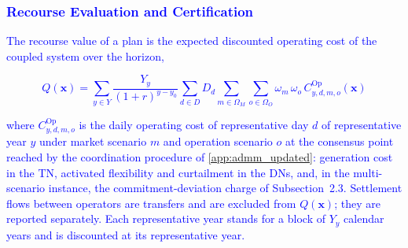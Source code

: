 
\subsubsection{\textcolor{blue}{Recourse Evaluation and Certification}}
\label{subsubsec:certification}

\textcolor{blue}{The recourse value of a plan is the expected discounted operating cost of the coupled system
over the horizon,}

\textcolor{blue}{
    \begin{equation}
        Q(\boldsymbol{x}) =
        \sum_{y \in Y} \frac{Y_y}{(1+r)^{y-y_0}}
        \sum_{d \in D} D_d
        \sum_{m \in \Omega_M} \sum_{o \in \Omega_O} \omega_m \, \omega_o \,
        C^{\text{Op}}_{y,d,m,o}(\boldsymbol{x})
        \label{eq:recourse_value}
    \end{equation}
}

\noindent
\textcolor{blue}{where $C^{\text{Op}}_{y,d,m,o}$ is the daily operating cost of representative day $d$ of
representative year $y$ under market scenario $m$ and operation scenario $o$ at the consensus point
reached by the coordination procedure of \ref{app:admm_updated}: generation cost in the TN, activated
flexibility and curtailment in the DNs, and, in the multi-scenario instance, the commitment-deviation
charge of Subsection~2.3. Settlement flows between operators are transfers and are excluded from
$Q(\boldsymbol{x})$; they are reported separately. Each representative year stands for a block of $Y_y$
calendar years and is discounted at its representative year.}



